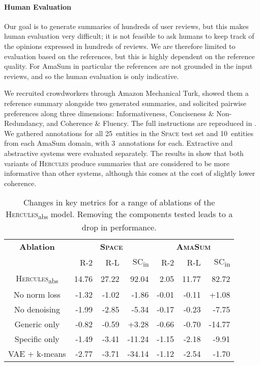 \documentclass[11pt]{article}
\begin{document}
\paragraph{Human Evaluation}



Our goal is to generate summaries of hundreds of user reviews, but this makes human evaluation very difficult; it is not feasible to ask humans to keep track of the opinions expressed in hundreds of reviews. We are therefore limited to evaluation based on the references, but this is highly dependent on the reference quality. For AmaSum in particular the references are not grounded in the input reviews, and so the human evaluation is only indicative.

We recruited crowdworkers through Amazon Mechanical Turk, showed them a reference summary alongside two generated summaries, and solicited pairwise preferences along three dimensions: Informativeness, Conciseness \& Non-Redundancy, and Coherence \& Fluency. The full instructions are reproduced in . We gathered annotations for all 25~entities in the \textsc{Space} test set and 10~entities from each AmaSum domain, with 3~annotations for each. Extractive and abstractive systems were evaluated separately. The results in  show that both variants of \textsc{Hercules} produce summaries that are considered to be more informative than other systems, although this comes at the cost of slightly lower coherence.




\begin{table}[t]
    \centering
    \small
    \begin{tabular}{@{~}c@{~}||@{~}r@{~}r@{~}r@{~}|@{~}r@{~}r@{~}r@{~}}
    \textbf{Ablation} & \multicolumn{3}{c}{\textsc{\textbf{Space}}} & \multicolumn{3}{c}{\textsc{\textbf{AmaSum}}} \\
     & R-2  & R-L  & SC\textsubscript{in}  & R-2  & R-L  & SC\textsubscript{in}  \\
    \hline\hline
        \textsc{Hercules}\textsubscript{abs} & {14.76} & {27.22} & 92.04 & {2.05} & {11.77} & 82.72   \\
        \hline
No norm loss & -1.32 & -1.02 & -1.86 & -0.01 & -0.11 & +1.08 \\
        No denoising & -1.99 & -2.85 & -5.34 & -0.17 & -0.23 & -7.75  \\
Generic only & -0.82 & -0.59 & +3.28 & -0.66 & -0.70 & -14.77 \\
        Specific only & -1.49 & -3.41 & -11.24 & -1.15 & -2.18 & -9.91 \\
        VAE + k-means & -2.77 & -3.71 & -34.14 & -1.12 & -2.54 & -1.70  \\
\end{tabular}
    \vspace{-0.1cm}
    \caption{Changes in key metrics for a range of ablations of the \textsc{Hercules}\textsubscript{abs} model. Removing the components tested leads to a drop in performance.}
    \vspace{-0.2cm}
    \label{tab:ablations}
\end{table}
\end{document}
